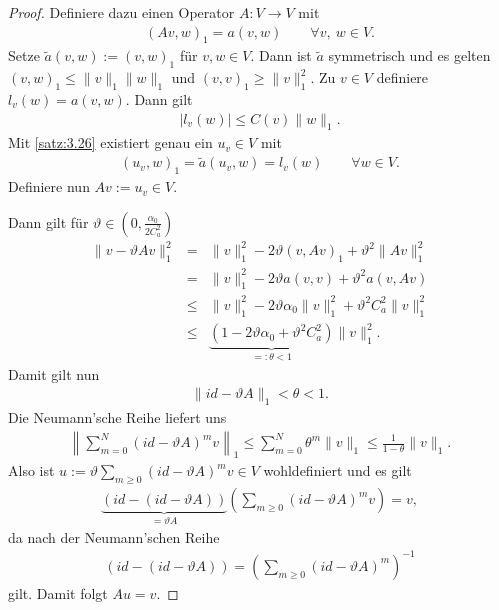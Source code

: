 \begin{proof}
    Definiere dazu einen Operator $A: V \to V$ mit
    \begin{eqnarray*}
        (Av, w)_1 = a(v, w) \qquad \forall v, \ w\in V.
    \end{eqnarray*}
    Setze $\tilde a(v, w) := (v, w)_1$ für $v, w\in V$. Dann ist $\tilde a$
    symmetrisch und es gelten $(v, w)_1 \le \|v\|_1 \|w\|_1$ und
    $(v, v)_1 \ge \|v\|_1^2$. Zu $v\in V$ definiere $l_v(w) = a(v, w)$.
    Dann gilt
    \begin{eqnarray*}
        |l_v(w)| \le C(v) \|w\|_1.
    \end{eqnarray*}
    Mit \eqref{satz:3.26} existiert genau ein $u_v\in V$ mit
    \begin{eqnarray*}
        (u_v, w)_1 = \tilde a(u_v, w) = l_v(w)
        \qquad \forall w\in V.
    \end{eqnarray*}
    Definiere nun $Av := u_v\in V$.

    Dann gilt für $\vartheta\in \left(0, \frac{\alpha_0}{2 C_a^2}\right)$
    \begin{eqnarray*}
            \|v - \vartheta Av\|_1^2
        &=& \|v\|_1^2 - 2 \vartheta (v, Av)_1 + \vartheta^2 \|Av\|_1^2 \\
        &=& \|v\|_1^2 - 2\vartheta a(v, v) + \vartheta^2 a(v, Av) \\
        &\le& \|v\|_1^2 - 2 \vartheta \alpha_0 \|v\|_1^2
              + \vartheta^2 C_a^2 \|v\|_1^2 \\
        &\le& \underbrace{(1 - 2\vartheta \alpha_0 + \vartheta^2 C_a^2)}
              _{=: \theta < 1} \|v\|_1^2.
    \end{eqnarray*}
    Damit gilt nun
    \begin{eqnarray*}
        \|id - \vartheta A\|_1 < \theta < 1.
    \end{eqnarray*}
    Die Neumann'sche Reihe liefert uns
    \begin{eqnarray*}
            \left\|\sum_{m=0}^N (id - \vartheta A)^m v\right\|_1
        \le \sum_{m=0}^N \theta^m \|v\|_1
        \le \frac{1}{1 - \theta} \|v\|_1.
    \end{eqnarray*}
    Also ist $u := \vartheta \sum_{m\ge0} (id - \vartheta A)^m v\in V$
    wohldefiniert und es gilt
    \begin{eqnarray*}
        \underbrace{(id - (id - \vartheta A))}_{= \vartheta A}
        \left(\sum_{m\ge0} (id - \vartheta A)^m v\right) = v,
    \end{eqnarray*}
    da nach der Neumann'schen Reihe
    \begin{eqnarray*}
          (id - (id - \vartheta A))
        = \left(\sum_{m\ge 0} (id - \vartheta A)^m\right)^{-1}
    \end{eqnarray*}
    gilt. Damit folgt $Au = v$.


\end{proof}
